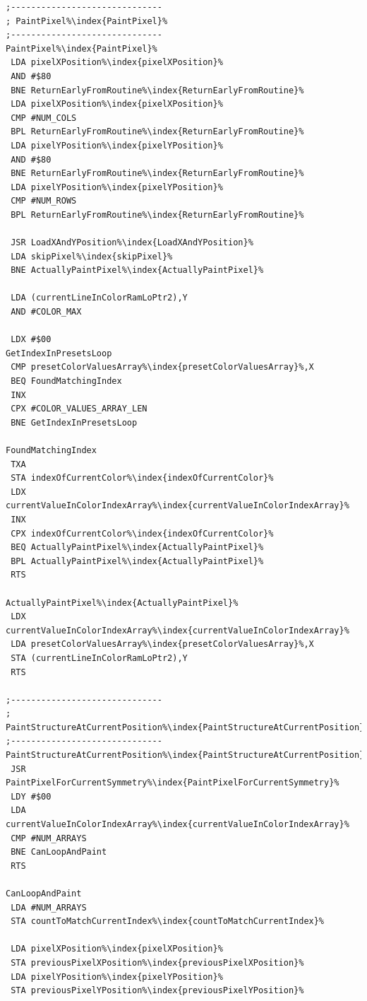 \begin{minipage}[b]{0.33\linewidth}
\begin{lrbox}{\mybox}%
\begin{lstlisting}[basicstyle=\ttfamily\tiny,escapechar=\%]
;------------------------------
; PaintPixel%\index{PaintPixel}%
;------------------------------
PaintPixel%\index{PaintPixel}%
 LDA pixelXPosition%\index{pixelXPosition}%
 AND #$80
 BNE ReturnEarlyFromRoutine%\index{ReturnEarlyFromRoutine}%
 LDA pixelXPosition%\index{pixelXPosition}%
 CMP #NUM_COLS
 BPL ReturnEarlyFromRoutine%\index{ReturnEarlyFromRoutine}%
 LDA pixelYPosition%\index{pixelYPosition}%
 AND #$80
 BNE ReturnEarlyFromRoutine%\index{ReturnEarlyFromRoutine}%
 LDA pixelYPosition%\index{pixelYPosition}%
 CMP #NUM_ROWS
 BPL ReturnEarlyFromRoutine%\index{ReturnEarlyFromRoutine}%

 JSR LoadXAndYPosition%\index{LoadXAndYPosition}%
 LDA skipPixel%\index{skipPixel}%
 BNE ActuallyPaintPixel%\index{ActuallyPaintPixel}%

 LDA (currentLineInColorRamLoPtr2),Y
 AND #COLOR_MAX

 LDX #$00
GetIndexInPresetsLoop
 CMP presetColorValuesArray%\index{presetColorValuesArray}%,X
 BEQ FoundMatchingIndex
 INX
 CPX #COLOR_VALUES_ARRAY_LEN
 BNE GetIndexInPresetsLoop

FoundMatchingIndex
 TXA
 STA indexOfCurrentColor%\index{indexOfCurrentColor}%
 LDX currentValueInColorIndexArray%\index{currentValueInColorIndexArray}%
 INX
 CPX indexOfCurrentColor%\index{indexOfCurrentColor}%
 BEQ ActuallyPaintPixel%\index{ActuallyPaintPixel}%
 BPL ActuallyPaintPixel%\index{ActuallyPaintPixel}%
 RTS

ActuallyPaintPixel%\index{ActuallyPaintPixel}%
 LDX currentValueInColorIndexArray%\index{currentValueInColorIndexArray}%
 LDA presetColorValuesArray%\index{presetColorValuesArray}%,X
 STA (currentLineInColorRamLoPtr2),Y
 RTS

;------------------------------
; PaintStructureAtCurrentPosition%\index{PaintStructureAtCurrentPosition}%
;------------------------------
PaintStructureAtCurrentPosition%\index{PaintStructureAtCurrentPosition}%
 JSR PaintPixelForCurrentSymmetry%\index{PaintPixelForCurrentSymmetry}%
 LDY #$00
 LDA currentValueInColorIndexArray%\index{currentValueInColorIndexArray}%
 CMP #NUM_ARRAYS
 BNE CanLoopAndPaint
 RTS

CanLoopAndPaint
 LDA #NUM_ARRAYS
 STA countToMatchCurrentIndex%\index{countToMatchCurrentIndex}%

 LDA pixelXPosition%\index{pixelXPosition}%
 STA previousPixelXPosition%\index{previousPixelXPosition}%
 LDA pixelYPosition%\index{pixelYPosition}%
 STA previousPixelYPosition%\index{previousPixelYPosition}%


\end{lstlisting}
\end{lrbox}
\end{minipage}
